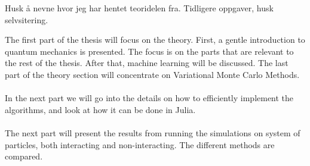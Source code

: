 Husk å nevne hvor jeg har hentet teoridelen fra. Tidligere oppgaver, husk selvsitering. 

The first part of the thesis will focus on the theory. First, a gentle introduction to quantum mechanics is presented. The focus is on the parts that are relevant to the rest of the thesis. After that, machine learning will be discussed. The last part of the theory section will concentrate on Variational Monte Carlo Methods. 
\\
\\
In the next part we will go into the details on how to efficiently implement the algorithms, and look at how it can be done in Julia. 
\\
\\
The next part will present the results from running the simulations on system of particles, both interacting and non-interacting. The different methods are compared.

\newpage